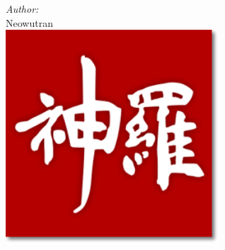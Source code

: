 \documentclass[12pt]{article}
\begin{document}
\begin{titlepage}
  \Large \emph{Author:}\\
  Neowutran \\[3cm] %




  \includegraphics[width=80mm]{shinra.png}\\[1cm] %


  \vfill %

\end{titlepage}




\tableofcontents
\pagebreak

\end{document}
